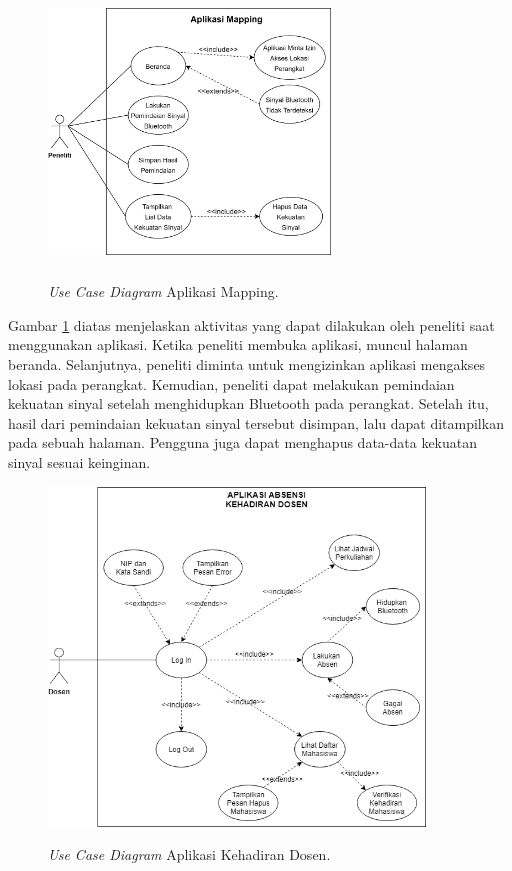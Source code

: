 	\begin{figure}[H]
		\center
		\shadowbox
		{\includegraphics [width=7.5cm, height=7cm]{gambar/model/use-case-mapping}}
		\caption{\textit{Use Case Diagram} Aplikasi Mapping.}
		\label{usecasemapping}
	\end{figure}
	
\par Gambar \ref{usecasemapping} diatas menjelaskan aktivitas yang dapat dilakukan oleh peneliti saat menggunakan aplikasi. Ketika peneliti membuka aplikasi, muncul halaman beranda. Selanjutnya, peneliti diminta untuk mengizinkan aplikasi mengakses lokasi pada perangkat. Kemudian, peneliti dapat melakukan pemindaian kekuatan sinyal setelah menghidupkan Bluetooth pada perangkat. Setelah itu, hasil dari pemindaian kekuatan sinyal tersebut disimpan, lalu dapat ditampilkan pada sebuah halaman. Pengguna juga dapat menghapus data-data kekuatan sinyal sesuai keinginan.
\fancyhf{} 
\fancyfoot[R]{\thepage}

\begin{figure}[H] 
		\center
		\shadowbox
		{\includegraphics [width=10cm, height=9cm]{gambar/model/use-case-dosen}}
		\caption{\textit{Use Case Diagram} Aplikasi Kehadiran Dosen.}
		\label{usecasedosen}
	\end{figure}

